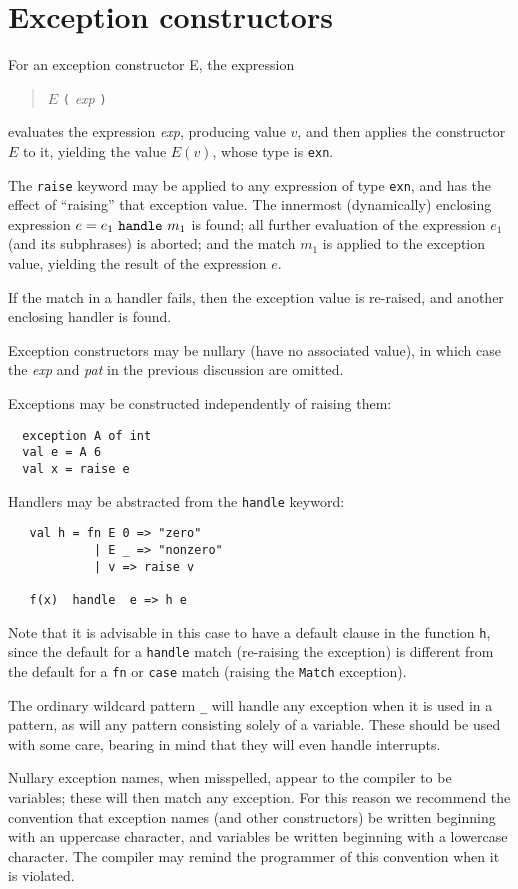 \section{Exception constructors}
For an exception constructor E, the expression
\begin{quote}
$E$ \verb"(" {\it exp} \verb")"
\end{quote}
evaluates the expression {\it exp}, producing value $v$,
and then applies the constructor $E$ to it, yielding the value
$E(v)$, whose type is \verb"exn".

The \verb"raise" keyword may be applied to any expression of type
\verb"exn", and has the effect of ``raising'' that exception value.
The innermost (dynamically) enclosing expression 
$e = e_1~\verb"handle"~m_1$ is found; all further evaluation of the
expression $e_1$ (and its subphrases) is aborted; and the match $m_1$
is applied to the exception value, yielding  the result of the
expression $e$.  

If the match in a handler fails, then the exception value is
\label{reraise}
re-raised, and another enclosing handler is found.

Exception constructors may be nullary (have no associated value), in
which case the {\it exp} and {\it pat} in the previous discussion are
omitted.

Exceptions may be constructed independently of raising them:
\begin{verbatim}
  exception A of int
  val e = A 6
  val x = raise e
\end{verbatim}
Handlers may be abstracted from the \verb"handle" keyword:
\begin{verbatim}
   val h = fn E 0 => "zero"
            | E _ => "nonzero"
            | v => raise v

   f(x)  handle  e => h e
\end{verbatim}
Note that it is advisable in this case to have a default clause in
the function \verb"h", since the default for a \verb"handle" match
(re-raising the exception) is different from the default for a \verb"fn" or
\verb"case" match (raising the \verb"Match" exception).

The ordinary wildcard pattern 
\verb"_" will handle any exception when it is used in a pattern, as
will any pattern consisting solely of a variable.  These should be
used with some care, bearing in mind that they will even handle
interrupts.

Nullary exception names, when misspelled, appear to the compiler to be
variables; these will then match any exception.  For this reason we
recommend the convention that exception names (and other
constructors) be written beginning with an uppercase character, and
variables be written beginning with a lowercase character.  The
compiler may remind the programmer of this convention when it is
violated.

